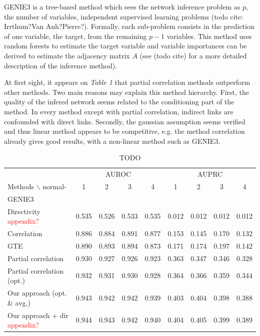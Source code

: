 \documentclass[wcp]{jmlr}
\begin{document}
GENIE3 is a tree-based method which sees the network inference problem as $p$,
the number of variables, independent supervised learning problems (todo cite:
Irrthum?Van Anh?Pierre?). Formally, each sub-problem consists in the
prediction of one variable, the target, from the remaining $p-1$ variables.
This method uses random forests to estimate the target variable and variable
importances can be derived to estimate the adjacency matrix $A$ (see (todo
cite) for a more detailed description of the inference method).

At first sight, it appears on \textit{Table 1} that partial correlation
methods outperform other methods. Two main reasons may explain this method
hierarchy. First, the quality of the infered network seems related to the
conditioning part of the method. In every method except with partial
correlation, indirect links are confounded with direct links.  Secondly, the
gaussian assumption seems verified and thus linear method appears to be
competitive, e.g. the method correlation already gives good results, with a
non-linear method such as GENIE3.



\begin{table}[tbh]
\centering
\caption{TODO}
\begin{tabular}{@{}l *{8}{c}@{}}
\toprule
  & \multicolumn{4}{c}{AUROC} & \multicolumn{4}{c}{AUPRC} \\
\cmidrule(r){2-5}\cmidrule(r){6-9}
Methods $\backslash$ normal- & 1 & 2 & 3 & 4 & 1 & 2 & 3 & 4 \\
\midrule
GENIE3                 & & & & & & & & \\
Directivity \textcolor{red}{appendix?} & 0.535 & 0.526 & 0.533 & 0.535 & 0.012 & 0.012 & 0.012 & 0.012 \\
Correlation            & 0.886 & 0.884 & 0.891 & 0.877 & 0.153 & 0.145 & 0.170 & 0.132 \\
GTE                    & 0.890 & 0.893 & 0.894 & 0.873 & 0.171 & 0.174 & 0.197 & 0.142 \\
Partial correlation    & 0.930 &  0.927 &  0.926 &  0.923& 0.363  & 0.347 &  0.346 & 0.328 \\
Partial correlation (opt.) & 0.932 & 0.931 & 0.930 & 0.928 & 0.364 & 0.366 & 0.359 & 0.344 \\
Our approach (opt. \& avg.)    & 0.943 & 0.942 & 0.942 & 0.939 & 0.403 & 0.404 & 0.398 & 0.388 \\
Our approach + dir  \textcolor{red}{appendix?}   & 0.944 & 0.943 & 0.942 & 0.940 & 0.404 & 0.405 & 0.399 & 0.389 \\
\bottomrule
\end{tabular}
\end{table}
\end{document}
